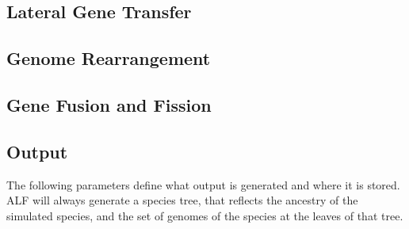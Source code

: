 \documentclass[11pt]{article}
\begin{document}
\subsection{Lateral Gene Transfer}

\subsection{Genome Rearrangement}  

\subsection{Gene Fusion and Fission}
%
%

\subsection{Output}
The following parameters define what output is generated and where it is stored. ALF will always generate a species tree, that reflects the ancestry of the simulated species, and the set of genomes of the species at the leaves of that tree.
\end{document}
